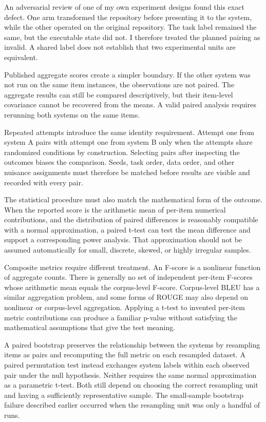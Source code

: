 An adversarial review of one of my own experiment designs found this exact defect. One arm transformed the repository before presenting it to the system, while the other operated on the original repository. The task label remained the same, but the executable state did not. I therefore treated the planned pairing as invalid. A shared label does not establish that two experimental units are equivalent.

Published aggregate scores create a simpler boundary. If the other system was not run on the same item instances, the observations are not paired. The aggregate results can still be compared descriptively, but their item-level covariance cannot be recovered from the means. A valid paired analysis requires rerunning both systems on the same items.

Repeated attempts introduce the same identity requirement. Attempt one from system A pairs with attempt one from system B only when the attempts share randomized conditions by construction. Selecting pairs after inspecting the outcomes biases the comparison. Seeds, task order, data order, and other nuisance assignments must therefore be matched before results are visible and recorded with every pair.

The statistical procedure must also match the mathematical form of the outcome. When the reported score is the arithmetic mean of per-item numerical contributions, and the distribution of paired differences is reasonably compatible with a normal approximation, a paired t-test can test the mean difference and support a corresponding power analysis. That approximation should not be assumed automatically for small, discrete, skewed, or highly irregular samples.

Composite metrics require different treatment. An F-score is a nonlinear function of aggregate counts. There is generally no set of independent per-item F-scores whose arithmetic mean equals the corpus-level F-score. Corpus-level BLEU has a similar aggregation problem, and some forms of ROUGE may also depend on nonlinear or corpus-level aggregation. Applying a t-test to invented per-item metric contributions can produce a familiar p-value without satisfying the mathematical assumptions that give the test meaning.

A paired bootstrap preserves the relationship between the systems by resampling items as pairs and recomputing the full metric on each resampled dataset. A paired permutation test instead exchanges system labels within each observed pair under the null hypothesis. Neither requires the same normal approximation as a parametric t-test. Both still depend on choosing the correct resampling unit and having a sufficiently representative sample. The small-sample bootstrap failure described earlier occurred when the resampling unit was only a handful of runs.

